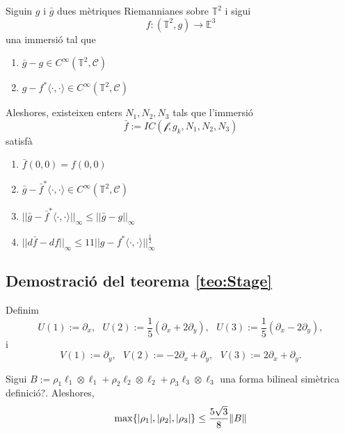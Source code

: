 \begin{teo}\label{teo:Stage}
    Siguin $g$ i $\bar g$ dues mètriques Riemannianes sobre $\mathbb T^2$ i sigui 
    \begin{equation*}
        f:(\mathbb T^2, g)\to\mathbb E^3
    \end{equation*}
    una immersió tal que
    \begin{enumerate}
        \item $\bar g - g\in C^\infty(\mathbb T^2, \mathcal C)$
        \item $g-f^*\langle\cdot, \cdot\rangle\in C^\infty(\mathbb T^2, \mathcal C)$
    \end{enumerate}
    Aleshores, existeixen enters $N_1, N_2, N_3$ tals que l'immersió
    \begin{equation*}
        \bar f:=IC(\mathcal f, g_k, N_1, N_2, N_3)
    \end{equation*}
    satisfà
    \begin{enumerate}
        \item $\bar f(0,0) = f(0,0)$
        \item $\bar g - \bar f^*\langle\cdot, \cdot\rangle\in C^\infty(\mathbb T^2, \mathcal C)$
        \item $||\bar g - \bar f^*\langle\cdot, \cdot\rangle||_\infty\le ||\bar g - g||_\infty$
        \item $||d\bar f - df||_\infty\le11||g-f^*\langle\cdot, \cdot\rangle||_\infty^{\frac{1}{2}}$
    \end{enumerate}
\end{teo}
\subsection{Demostració del teorema \ref{teo:Stage}}
Definim 
\begin{equation*}
    U(1):=\partial_x, \text{ } U(2):=\frac15(\partial_x+2\partial_y), \text{ } U(3):=\frac15(\partial_x-2\partial_y),
\end{equation*}
i 
\begin{equation*}
    V(1):=\partial_y, \text{ } V(2):=-2\partial_x+\partial_y, \text{ } V(3):=2\partial_x+\partial_y.
\end{equation*}
\begin{lema}
    Sigui $B:=\rho_1\ell_1\otimes\ell_1 + \rho_2\ell_2\otimes\ell_2 + \rho_3\ell_3\otimes\ell_3$ una forma bilineal simètrica {\color{blue} definició?}. Aleshores,
    \begin{equation*}
        \max\{|\rho_1|, |\rho_2|, |\rho_3|\} \le \frac{5\sqrt3}8 \|B\|
    \end{equation*}
\end{lema}
